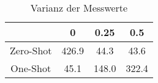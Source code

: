 \bgroup
\def\arraystretch{2}
\begin{table}[H]
	\vspace{.5cm}
	\centering		
	\begin{center}
		\begin{tabular}{|c||c|c|c|}
			\hline 
			& 0 & 0.25 & 0.5 \\
			\hline 
			\hline
			Zero-Shot & 426.9 & 44.3 & 43.6 \\
			\hline
			One-Shot & 45.1 & 148.0 & 322.4 \\
			\hline
		\end{tabular} 
	\end{center}
	\caption{Varianz der Messwerte}
	\label{fig:line-var}
	\vspace{-.8cm}
\end{table}
\egroup